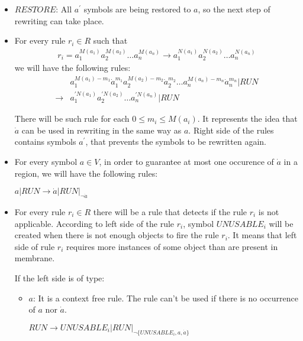 \begin{dokaz}
\begin{itemize}
    \item $\mathit{RESTORE}$: All $a^{\prime}$ symbols are being restored to $a$, so the next step of rewriting can take place.
  \end{itemize}


  \begin{itemize}
    \item For every rule $r_i\in R$ such that
      \begin{align*}
        r_i = a_1^{M(a_1)}a_2^{M(a_2)}\dots a_n^{M(a_n)} \rightarrow a_1^{N(a_1)}a_2^{N(a_2)}\dots a_n^{N(a_n)}
      \end{align*}
      we will have the following rules:
      \begin{align*}
        &a_1^{M(a_1)-m_1}\dot{a}_1^{m_1}
        a_2^{M(a_2)-m_2}\dot{a}_2^{m_2}\dots
        a_n^{M(a_n)-m_n}\dot{a}_n^{m_n}|\mathit{RUN} \\
        \rightarrow &a_1^{\prime N(a_1)}a_2^{\prime N(a_2)}\dots a_n^{\prime N(a_n)}|\mathit{RUN}
      \end{align*}
      
      There will be such rule for each $0\leq m_i\leq M(a_i)$. It represents the idea that $\dot{a}$ can be used in rewriting in the same way as $a$. Right side of the rules contains symbols $a^\prime$, that prevents the symbols to be rewritten again.

    \item For every symbol $a\in V$, in order to guarantee at most one occurence of $\dot{a}$ in a region, we will have the following rules:

    $a|\mathit{RUN} \rightarrow \dot{a}|\mathit{RUN}|_{\neg \dot{a}}$

    \item For every rule $r_i\in R$ there will be a rule that detects if the rule $r_i$ is not applicable. According to left side of the rule $r_i$, symbol $\mathit{UNUSABLE_i}$ will be created when there is not enough objects to fire the rule $r_i$. It means that left side of rule $r_i$ requires more instances of some object than are present in membrane.

    If the left side is of type:
    \begin{itemize}
      \item $a$: It is a context free rule. The rule can't be used if there is no occurrence of $a$ nor $\dot{a}$.

      $\mathit{RUN} \rightarrow \mathit{UNUSABLE_i}|\mathit{RUN}|_{\neg\{\mathit{UNUSABLE_i}, a, \dot{a}\}}$


\end{itemize}
\end{itemize}
\end{dokaz}
